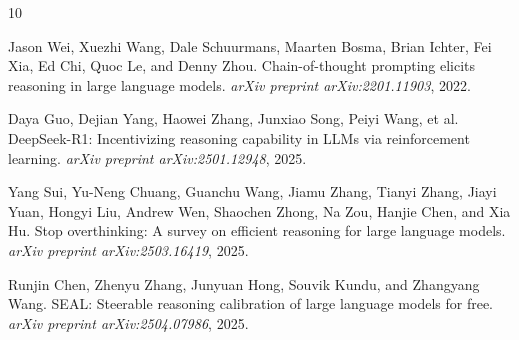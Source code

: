 \documentclass[11pt]{article}
\begin{document}
\begin{thebibliography}{10}

Jason Wei, Xuezhi Wang, Dale Schuurmans, Maarten Bosma, Brian Ichter, Fei Xia, Ed Chi, Quoc Le, and Denny Zhou.
Chain-of-thought prompting elicits reasoning in large language models.
\textit{arXiv preprint arXiv:2201.11903}, 2022.

Daya Guo, Dejian Yang, Haowei Zhang, Junxiao Song, Peiyi Wang, et al.
DeepSeek-R1: Incentivizing reasoning capability in LLMs via reinforcement learning.
\textit{arXiv preprint arXiv:2501.12948}, 2025.

Yang Sui, Yu-Neng Chuang, Guanchu Wang, Jiamu Zhang, Tianyi Zhang, Jiayi Yuan, Hongyi Liu, Andrew Wen, Shaochen Zhong, Na Zou, Hanjie Chen, and Xia Hu.
Stop overthinking: A survey on efficient reasoning for large language models.
\textit{arXiv preprint arXiv:2503.16419}, 2025.

Runjin Chen, Zhenyu Zhang, Junyuan Hong, Souvik Kundu, and Zhangyang Wang.
SEAL: Steerable reasoning calibration of large language models for free.
\textit{arXiv preprint arXiv:2504.07986}, 2025.

\end{thebibliography}
\end{document}
